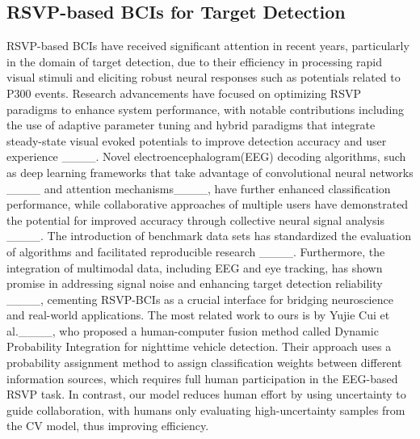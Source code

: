 \subsection{RSVP-based BCIs for Target Detection}
RSVP-based BCIs have received significant attention in recent years, particularly in the domain of target detection, due to their efficiency in processing rapid visual stimuli and eliciting robust neural responses such as potentials related to P300 events. Research advancements have focused on optimizing RSVP paradigms to enhance system performance, with notable contributions including the use of adaptive parameter tuning and hybrid paradigms that integrate steady-state visual evoked potentials to improve detection accuracy and user experience ____. Novel electroencephalogram(EEG) decoding algorithms, such as deep learning frameworks that take advantage of convolutional neural networks ____ and attention mechanisms____, have further enhanced classification performance, while collaborative approaches of multiple users have demonstrated the potential for improved accuracy through collective neural signal analysis ____. The introduction of benchmark data sets has standardized the evaluation of algorithms and facilitated reproducible research ____. Furthermore, the integration of multimodal data, including EEG and eye tracking, has shown promise in addressing signal noise and enhancing target detection reliability ____, cementing RSVP-BCIs as a crucial interface for bridging neuroscience and real-world applications. The most related work to ours is by Yujie Cui et al.____, who proposed a human-computer fusion method called Dynamic Probability Integration for nighttime vehicle detection. Their approach uses a probability assignment method to assign classification weights between different information sources, which requires full human participation in the EEG-based RSVP task. In contrast, our model reduces human effort by using uncertainty to guide collaboration, with humans only evaluating high-uncertainty samples from the CV model, thus improving efficiency.